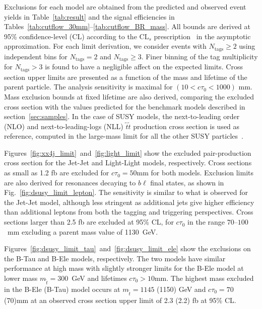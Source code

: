 Exclusions for each model are obtained from the predicted and observed
event yields in Table~\ref{tab:result} and the signal efficiencies in
Tables~\ref{tab:cutflow_30mm}--\ref{tab:cutflow_BR_mass}.  All bounds
are derived at 95\% confidence-level (CL) according to the CL$_{s}$
prescription~\cite{CLs1,CLs2,LHCCLs} in the asymptotic approximation.
For each limit derivation, we consider events with $N_{\textrm{tags}}\geq 2$ 
using independent bins for $N_{\textrm{tags}}=2$ and
$N_{\textrm{tags}}\geq 3$. Finer binning of the tag multiplicity for $N_{\textrm{tags}}>3$
is found to have a negligible affect on the expected limits. 
Cross section upper limits are
 presented as a function of the
mass and lifetime of the parent particle.  The analysis sensitivity is
maximal for $(10 < c\tau_0 < 1000)$ mm. Mass exclusion bounds at
fixed lifetime are also derived, comparing the excluded cross section
with the values predicted for the benchmark models described in
section~\ref{sec:samples}. In the case of SUSY models, the
next-to-leading order (NLO) and next-to-leading-logs (NLL)
$\tilde{t}\tilde{t}$ production cross section is used as reference,
computed in the large-mass limit for all the other SUSY
particles~\cite{NLONLL1,NLONLL2,NLONLL3,NLONLL4,NLONLL5,NLONLLerr}.

Figures~\ref{fig:xx4j_limit}~and~\ref{fig:light_limit} show the
excluded pair-production cross section for the Jet-Jet and Light-Light
models, respectively. Cross sections as small as 1.2 fb are excluded
for $c\tau_0=50$mm for both models. 
Exclusion limits are also derived for resonances decaying to $b\ell$
final states, as shown in Fig.~\ref{fig:dsusy_limit_lepton}. The
sensitivity is similar to what is observed for the Jet-Jet model,
although less stringent as additional jets give higher efficiency than
additional leptons from both the tagging and triggering
perspectives. Cross sections larger than 2.5 fb are excluded at 95\%
CL, for $c\tau_0$ in the range $70$--$100$~mm excluding a
parent mass value of 1130~GeV.  

Figures~\ref{fig:dsusy_limit_tau}~and~\ref{fig:dsusy_limit_ele} show
the exclusions on the B-Tau and B-Ele models, respectively. The two
models have similar performance at high mass  with slightly stronger limits 
for the B-Ele model at lower
mass $m_{\tilde{t}}=300$~GeV and lifetimes $c\tau_0>10$mm. The
highest mass excluded in the B-Ele (B-Tau) model occurs at
$m_{\tilde{t}}=1145$ (1150) GeV and $c\tau_0=70$ (70)mm at an
observed cross section upper limit of 2.3 (2.2) fb at 95\% CL.


